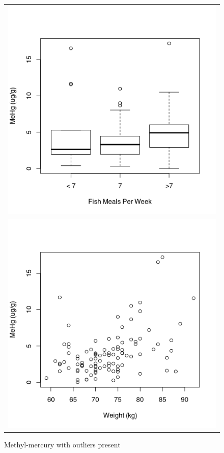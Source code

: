 \documentclass[twocolumn, 12pt]{report}
\begin{document}
\begin{figure}
	\begin{tabular}{c}
		\includegraphics[width=\linewidth]{res/me_meals_dirty.png} \\
		\includegraphics[width=\linewidth]{res/me_weight_dirty.png}
	\end{tabular}
	\caption{Methyl-mercury with outliers present}
	\label{fig:methyl dirty}
\end{figure}
\end{document}
